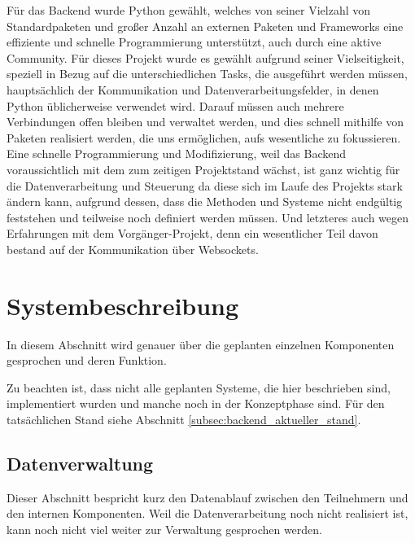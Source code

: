 Für das Backend wurde Python gewählt, 
welches von seiner Vielzahl von Standardpaketen 
und großer Anzahl an externen Paketen 
und Frameworks eine effiziente und schnelle Programmierung unterstützt, 
auch durch eine aktive Community.
% 
Für dieses Projekt wurde es gewählt aufgrund seiner Vielseitigkeit, 
speziell in Bezug auf die unterschiedlichen Tasks, 
die ausgeführt werden müssen, 
hauptsächlich der Kommunikation und Datenverarbeitungsfelder, 
in denen Python üblicherweise verwendet wird.
% 
Darauf müssen auch mehrere Verbindungen offen bleiben und verwaltet werden, 
und dies schnell mithilfe von Paketen realisiert werden, 
die uns ermöglichen, aufs wesentliche zu fokussieren.
% 
Eine schnelle Programmierung und Modifizierung, 
weil das Backend voraussichtlich mit dem zum zeitigen Projektstand wächst, 
ist ganz wichtig für die Datenverarbeitung und Steuerung 
da diese sich im Laufe des Projekts stark ändern kann, aufgrund dessen, 
dass die Methoden und Systeme nicht endgültig feststehen 
und teilweise noch definiert werden müssen.
% 
Und letzteres auch wegen Erfahrungen mit dem Vorgänger-Projekt, 
denn ein wesentlicher Teil davon bestand auf der Kommunikation über Websockets.
\section{Systembeschreibung}
In diesem Abschnitt wird genauer 
über die geplanten einzelnen Komponenten gesprochen 
und deren Funktion.

Zu beachten ist, dass nicht alle geplanten Systeme, die hier beschrieben sind, 
implementiert wurden und manche noch in der Konzeptphase sind.
Für den tatsächlichen Stand siehe Abschnitt \ref{subsec:backend_aktueller_stand}.

\subsection{Datenverwaltung}
\label{subsec:backend_data}

Dieser Abschnitt bespricht kurz den Datenablauf 
zwischen den Teilnehmern und den internen Komponenten.
% 
Weil die Datenverarbeitung noch nicht realisiert ist, 
kann noch nicht viel weiter zur Verwaltung gesprochen werden.

